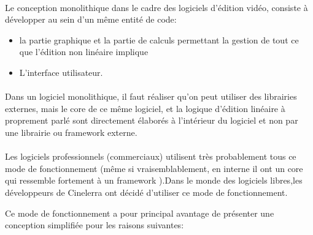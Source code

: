 \paragraph{}

Le conception monolithique  dans le cadre des
logiciels d'édition vidéo, consiste à développer au sein d'un même
entité de code:

\begin{itemize} \setlength{\itemsep}{2mm}

  \item {la partie graphique et la partie de calculs
    permettant la gestion de tout ce que l'édition non linéaire
    implique}

  \item {L'interface utilisateur.}

\end {itemize}

\paragraph{}

Dans un logiciel monolithique, il faut réaliser qu'on
peut utiliser des librairies externes, mais le core de ce même logiciel,
et la logique d'édition linéaire à proprement parlé sont directement
élaborés à l'intérieur du logiciel et non par une librairie ou
framework  externe.

\paragraph{}

Les logiciels professionnels (commerciaux) utilisent très probablement
tous ce mode de fonctionnement (même si vraisemblablement,
en interne il ont un core qui ressemble fortement à un framework
).Dans le monde des logiciels libres,les développeurs
de Cinelerra ont décidé d'utiliser ce mode de fonctionnement.

Ce mode de fonctionnement a pour principal avantage de présenter une
conception simplifiée pour les raisons suivantes:


